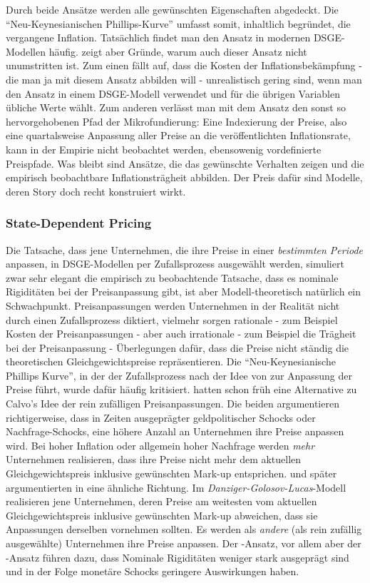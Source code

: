 Durch beide Ansätze werden alle gewünschten Eigenschaften abgedeckt. Die "`Neu-Keynesianischen Phillips-Kurve"' umfasst somit, inhaltlich begründet, die vergangene Inflation. Tatsächlich findet man den Ansatz in modernen DSGE-Modellen häufig. \textcite[S. 344f]{Romer2019} zeigt aber Gründe, warum auch dieser Ansatz nicht unumstritten ist. Zum einen fällt auf, dass die Kosten der Inflationsbekämpfung - die man ja mit diesem Ansatz abbilden will - unrealistisch gering sind, wenn man den Ansatz in einem DSGE-Modell verwendet und für die übrigen Variablen übliche Werte wählt. Zum anderen verlässt man mit dem Ansatz den sonst so hervorgehobenen Pfad der Mikrofundierung: Eine Indexierung der Preise, also eine quartalsweise Anpassung aller Preise an die veröffentlichten Inflationsrate, kann in der Empirie nicht beobachtet werden, ebensowenig vordefinierte Preispfade. Was bleibt sind Ansätze, die das gewünschte Verhalten zeigen und die empirisch beobachtbare Inflationsträgheit abbilden. Der Preis dafür sind Modelle, deren Story doch recht konstruiert wirkt.  

\subsubsection{State-Dependent Pricing}
Die Tatsache, dass jene Unternehmen, die ihre Preise in einer \textit{bestimmten Periode} anpassen, in DSGE-Modellen per Zufallsprozess ausgewählt werden, simuliert zwar sehr elegant die empirisch zu beobachtende Tatsache, dass es nominale Rigiditäten bei der Preisanpassung gibt, ist aber Modell-theoretisch natürlich ein Schwachpunkt. Preisanpassungen werden Unternehmen in der Realität nicht durch einen Zufallsprozess diktiert, vielmehr sorgen rationale - zum Beispiel Kosten der Preisanpassungen - aber auch irrationale - zum Beispiel die Trägheit bei der Preisanpassung - Überlegungen dafür, dass die Preise nicht ständig die theoretischen Gleichgewichtspreise repräsentieren. Die "`Neu-Keynesianische Phillips Kurve"', in der der Zufallsprozess nach der Idee von \textcite{Calvo1983} zur Anpassung der Preise führt, wurde dafür häufig kritisiert. \textcite{Caplin1987} hatten schon früh eine Alternative zu Calvo's Idee der rein zufälligen Preisanpassungen. Die beiden argumentieren richtigerweise, dass in Zeiten ausgeprägter geldpolitischer Schocks oder Nachfrage-Schocks, eine höhere Anzahl an Unternehmen ihre Preise anpassen wird. Bei hoher Inflation oder allgemein hoher Nachfrage werden \textit{mehr} Unternehmen realisieren, dass ihre Preise nicht mehr dem aktuellen Gleichgewichtspreis inklusive gewünschten Mark-up entsprichen. \textcite{Danziger1999} und später \textcite{Golosov2007} argumentierten in eine ähnliche Richtung. Im \textit{Danziger-Golosov-Lucas}-Modell realisieren jene Unternehmen, deren Preise am weitesten vom aktuellen Gleichgewichtspreis inklusive gewünschten Mark-up abweichen, dass sie Anpassungen derselben vornehmen sollten. Es werden als \textit{andere} (als rein zufällig ausgewählte) Unternehmen ihre Preise anpassen. Der \textcite{Caplin1987}-Ansatz, vor allem aber der \textcite{Golosov2007}-Ansatz führen dazu, dass Nominale Rigiditäten weniger stark ausgeprägt sind und in der Folge monetäre Schocks geringere Auswirkungen haben.

